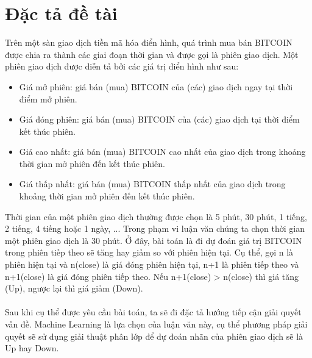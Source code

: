 \section{Đặc tả đề tài}
Trên một sàn giao dịch tiền mã hóa điển hình, quá trình mua bán BITCOIN được chia ra 
thành các giai đoạn thời gian và được gọi là phiên giao dịch. Một phiên giao dịch 
được diễn tả bởi các giá trị điển hình như sau:
\begin{itemize}
\item Giá mở phiên: giá bán (mua) BITCOIN của (các) giao dịch ngay tại thời 
điểm mở phiên.
\item Giá đóng phiên: giá bán (mua) BITCOIN của (các) giao dịch tại thời điểm 
kết thúc phiên.
\item Giá cao nhất: giá bán (mua) BITCOIN cao nhất của giao dịch trong khoảng 
thời gian mở phiên đến kết thúc phiên.
\item Giá thấp nhất: giá bán (mua) BITCOIN thấp nhất của giao dịch trong khoảng 
thời gian mở phiên đến kết thúc phiên.
\end{itemize}
Thời gian của một phiên giao dịch thường được chọn là 5 phút, 30 phút, 1 tiếng, 2 tiếng, 
4 tiếng hoặc 1 ngày, ... 
Trong phạm vi luận văn chúng ta chọn thời gian một phiên giao dịch là 30 phút.
Ở đây, bài toán là đi dự đoán giá trị BITCOIN trong phiên tiếp theo sẽ tăng 
hay giảm so với phiên hiện tại. Cụ thể, gọi n là phiên hiện tại và n(close) 
là giá đóng phiên hiện tại, n+1 là phiên tiếp theo và n+1(close) là giá đóng 
phiên tiếp theo. Nếu n+1(close) > n(close) thì giá tăng (Up), ngược lại thì 
giá giảm (Down).\\\\
Sau khi cụ thể được yêu cầu bài toán, ta sẽ đi đặc tả hướng tiếp cận giải quyết 
vấn đề. Machine Learning là lựa chọn của luận văn này, cụ thể phương pháp giải quyết 
sẽ sử dụng giải thuật phân lớp để dự đoán nhãn của phiên giao dịch sẽ là Up hay Down.


